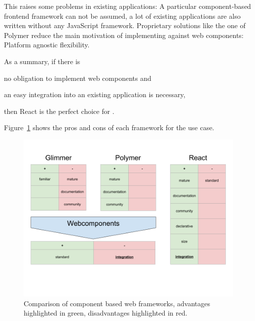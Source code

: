 This raises some problems in existing applications:
A particular component-based frontend framework can not be assumed, a lot of existing applications are also written without any JavaScript framework.
Proprietary solutions like the one of Polymer reduce the main motivation of implementing against web components:
Platform agnostic flexibility.

As a summary, if there is
\begin{enumerate*}[label=(\arabic*)]
  \item no obligation to implement web components and
  \item an easy integration into an existing application is necessary,
\end{enumerate*}
then React is the perfect choice for \cmvs{}.

Figure~\ref{fig:implementation:frontend-frameworks} shows the pros and cons of each framework for the use case.

\begin{figure}[h]
  \centering
  \caption{Comparison of component based web frameworks, advantages highlighted in green, disadvantages highlighted in red.}
  \label{fig:implementation:frontend-frameworks}
  \includegraphics[width=\textwidth]{images/frontend-frameworks.png}
\end{figure}

